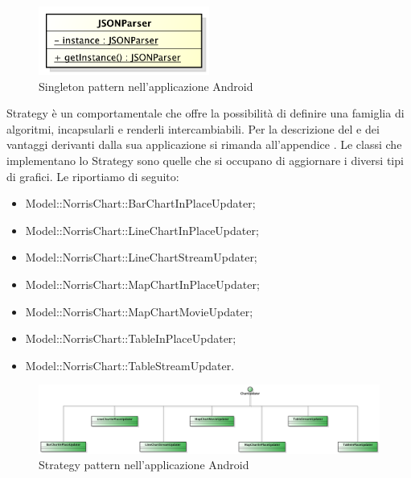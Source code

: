 	    			\begin{figure}[H]\centering
	        			\includegraphics[width=0.5\textwidth]{SpecificaTecnica/Pics/DesignPatternApp/Singleton3}
	        			\caption{Singleton pattern nell'applicazione Android}
	    			\end{figure}
			Strategy è un  comportamentale che offre la possibilità di definire una famiglia di
algoritmi, incapsularli e renderli intercambiabili. Per la descrizione del  e dei vantaggi derivanti dalla sua applicazione si rimanda all'appendice .
					Le classi che implementano lo Strategy sono quelle che si occupano di aggiornare i diversi tipi di grafici. Le riportiamo di seguito:
					\begin{itemize}
					\item Model::NorrisChart::BarChartInPlaceUpdater;
					\item Model::NorrisChart::LineChartInPlaceUpdater;
					\item Model::NorrisChart::LineChartStreamUpdater;
					\item Model::NorrisChart::MapChartInPlaceUpdater;
					\item Model::NorrisChart::MapChartMovieUpdater;
					\item Model::NorrisChart::TableInPlaceUpdater;
					\item Model::NorrisChart::TableStreamUpdater.
				\end{itemize}
				\begin{figure}[H]\centering
	        		\includegraphics[width=\textwidth]{SpecificaTecnica/Pics/DesignPatternNorris/Strategy}
	        		\caption{Strategy pattern nell'applicazione Android}
	    		\end{figure}

